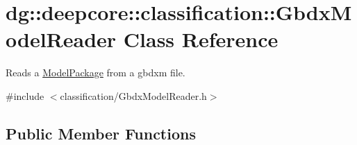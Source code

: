\hypertarget{classdg_1_1deepcore_1_1classification_1_1_gbdx_model_reader}{}\section{dg\+:\+:deepcore\+:\+:classification\+:\+:Gbdx\+Model\+Reader Class Reference}
\label{classdg_1_1deepcore_1_1classification_1_1_gbdx_model_reader}


Reads a \hyperlink{classdg_1_1deepcore_1_1classification_1_1_model_package}{Model\+Package} from a gbdxm file.  




{\ttfamily \#include $<$classification/\+Gbdx\+Model\+Reader.\+h$>$}

\subsection*{Public Member Functions}
